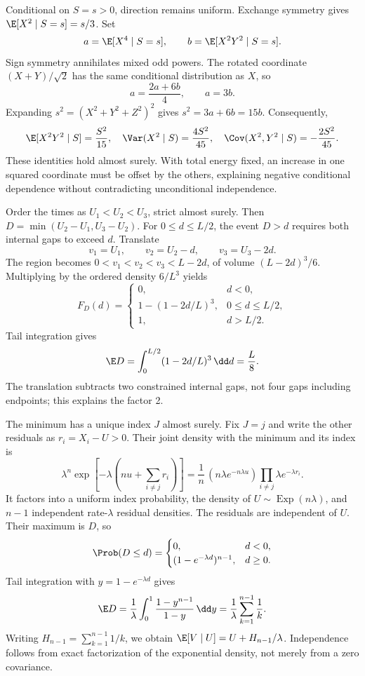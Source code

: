 Conditional on $S=s>0$, direction remains uniform. Exchange symmetry gives $\E[X^2\mid S=s]=s/3$. Set
\[
a=\E[X^4\mid S=s],\qquad b=\E[X^2Y^2\mid S=s].
\]
Sign symmetry annihilates mixed odd powers. The rotated coordinate $(X+Y)/\sqrt2$ has the same conditional distribution as $X$, so
\[
a=\frac{2a+6b}{4},\qquad a=3b.
\]
Expanding $s^2=(X^2+Y^2+Z^2)^2$ gives $s^2=3a+6b=15b$. Consequently,
\[
\E[X^2Y^2\mid S]=\frac{S^2}{15},\quad
\Var(X^2\mid S)=\frac{4S^2}{45},\quad
\Cov(X^2,Y^2\mid S)=-\frac{2S^2}{45}.
\]
These identities hold almost surely. With total energy fixed, an increase in one squared coordinate must be offset by the others, explaining negative conditional dependence without contradicting unconditional independence.

Order the times as $U_1<U_2<U_3$, strict almost surely. Then $D=\min(U_2-U_1,U_3-U_2)$. For $0\le d\le L/2$, the event $D>d$ requires both internal gaps to exceed $d$. Translate
\[
v_1=U_1,\qquad v_2=U_2-d,\qquad v_3=U_3-2d.
\]
The region becomes $0<v_1<v_2<v_3<L-2d$, of volume $(L-2d)^3/6$. Multiplying by the ordered density $6/L^3$ yields
\[
F_D(d)=
\begin{cases}
0,&d<0,\\
1-(1-2d/L)^3,&0\le d\le L/2,\\
1,&d>L/2.
\end{cases}
\]
Tail integration gives
\[
\E D=\int_0^{L/2}(1-2d/L)^3\,\dd d=\frac L8.
\]
The translation subtracts two constrained internal gaps, not four gaps including endpoints; this explains the factor 2.

The minimum has a unique index $J$ almost surely. Fix $J=j$ and write the other residuals as $r_i=X_i-U>0$. Their joint density with the minimum and its index is
\[
\lambda^n\exp\!\left[-\lambda\!\left(nu+\sum_{i\ne j}r_i\right)\right]
=\frac1n\,(n\lambda e^{-n\lambda u})
 \prod_{i\ne j}\lambda e^{-\lambda r_i}.
\]
It factors into a uniform index probability, the density of $U\sim\operatorname{Exp}(n\lambda)$, and $n-1$ independent rate-$\lambda$ residual densities. The residuals are independent of $U$. Their maximum is $D$, so
\[
\Prob(D\le d)=
\begin{cases}0,&d<0,\\(1-e^{-\lambda d})^{n-1},&d\ge0.\end{cases}
\]
Tail integration with $y=1-e^{-\lambda d}$ gives
\[
\E D=\frac1\lambda\int_0^1\frac{1-y^{n-1}}{1-y}\,\dd y
=\frac1\lambda\sum_{k=1}^{n-1}\frac1k.
\]
Writing $H_{n-1}=\sum_{k=1}^{n-1}1/k$, we obtain $\E[V\mid U]=U+H_{n-1}/\lambda$. Independence follows from exact factorization of the exponential density, not merely from a zero covariance.

